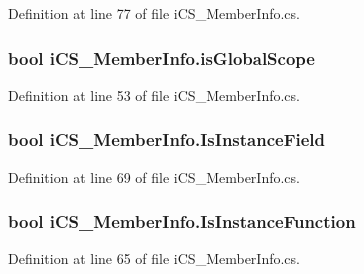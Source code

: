 Definition at line 77 of file i\+C\+S\+\_\+\+Member\+Info.\+cs.

\hypertarget{classi_c_s___member_info_a094243ef831ec40e9e7b7e89c8209cce}{
\subsubsection[{is\+Global\+Scope}]{\setlength{\rightskip}{0pt plus 5cm}bool i\+C\+S\+\_\+\+Member\+Info.\+is\+Global\+Scope\hspace{0.3cm}{\ttfamily [get]}}}\label{classi_c_s___member_info_a094243ef831ec40e9e7b7e89c8209cce}


Definition at line 53 of file i\+C\+S\+\_\+\+Member\+Info.\+cs.

\hypertarget{classi_c_s___member_info_ac64de19e594d88d71dea5ae9596ed938}{
\subsubsection[{Is\+Instance\+Field}]{\setlength{\rightskip}{0pt plus 5cm}bool i\+C\+S\+\_\+\+Member\+Info.\+Is\+Instance\+Field\hspace{0.3cm}{\ttfamily [get]}}}\label{classi_c_s___member_info_ac64de19e594d88d71dea5ae9596ed938}


Definition at line 69 of file i\+C\+S\+\_\+\+Member\+Info.\+cs.

\hypertarget{classi_c_s___member_info_afdae96603c50ca95b1841dede73883f7}{
\subsubsection[{Is\+Instance\+Function}]{\setlength{\rightskip}{0pt plus 5cm}bool i\+C\+S\+\_\+\+Member\+Info.\+Is\+Instance\+Function\hspace{0.3cm}{\ttfamily [get]}}}\label{classi_c_s___member_info_afdae96603c50ca95b1841dede73883f7}


Definition at line 65 of file i\+C\+S\+\_\+\+Member\+Info.\+cs.

